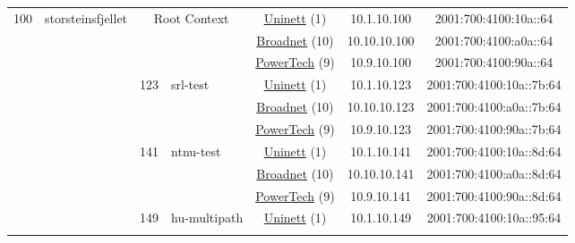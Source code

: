 \begin{small}
\begin{center}
\begin{longtable}{|c|c|c|c|c|c|c|c|}
 \multirow{33}{*}{\tiny{100}} & \multicolumn{1}{|l|}{\multirow{33}{*}{\tiny{storsteinsfjellet}}} & \multicolumn{2}{|c|}{\multirow{3}{*}{\tiny{Root Context}}} & \multicolumn{2}{|c|}{\tiny{\href{https://www.uninett.no}{Uninett} (1)}} & \tiny{10.1.10.100} & \tiny{2001:700:4100:10a::64} \\* \cline{5-5}\cline{6-6}\cline{7-7}\cline{8-8}
  &  & \multicolumn{2}{|c|}{} & \multicolumn{2}{|c|}{\tiny{\href{https://www.broadnet.no}{Broadnet} (10)}} & \tiny{10.10.10.100} & \tiny{2001:700:4100:a0a::64} \\* \cline{5-5}\cline{6-6}\cline{7-7}\cline{8-8}
  &  & \multicolumn{2}{|c|}{} & \multicolumn{2}{|c|}{\tiny{\href{http://www.powertech.no}{PowerTech} (9)}} & \tiny{10.9.10.100} & \tiny{2001:700:4100:90a::64} \\* \cline{3-3}\cline{4-4}\cline{5-5}\cline{6-6}\cline{7-7}\cline{8-8}
  &  & \multirow{3}{*}{\tiny{123}} & \multicolumn{1}{|l|}{\multirow{3}{*}{\tiny{srl-test}}} & \multicolumn{2}{|c|}{\tiny{\href{https://www.uninett.no}{Uninett} (1)}} & \tiny{10.1.10.123} & \tiny{2001:700:4100:10a::7b:64} \\* \cline{5-5}\cline{6-6}\cline{7-7}\cline{8-8}
  &  &  &  & \multicolumn{2}{|c|}{\tiny{\href{https://www.broadnet.no}{Broadnet} (10)}} & \tiny{10.10.10.123} & \tiny{2001:700:4100:a0a::7b:64} \\* \cline{5-5}\cline{6-6}\cline{7-7}\cline{8-8}
  &  &  &  & \multicolumn{2}{|c|}{\tiny{\href{http://www.powertech.no}{PowerTech} (9)}} & \tiny{10.9.10.123} & \tiny{2001:700:4100:90a::7b:64} \\* \cline{3-3}\cline{4-4}\cline{5-5}\cline{6-6}\cline{7-7}\cline{8-8}
  &  & \multirow{3}{*}{\tiny{141}} & \multicolumn{1}{|l|}{\multirow{3}{*}{\tiny{ntnu-test}}} & \multicolumn{2}{|c|}{\tiny{\href{https://www.uninett.no}{Uninett} (1)}} & \tiny{10.1.10.141} & \tiny{2001:700:4100:10a::8d:64} \\* \cline{5-5}\cline{6-6}\cline{7-7}\cline{8-8}
  &  &  &  & \multicolumn{2}{|c|}{\tiny{\href{https://www.broadnet.no}{Broadnet} (10)}} & \tiny{10.10.10.141} & \tiny{2001:700:4100:a0a::8d:64} \\* \cline{5-5}\cline{6-6}\cline{7-7}\cline{8-8}
  &  &  &  & \multicolumn{2}{|c|}{\tiny{\href{http://www.powertech.no}{PowerTech} (9)}} & \tiny{10.9.10.141} & \tiny{2001:700:4100:90a::8d:64} \\* \cline{3-3}\cline{4-4}\cline{5-5}\cline{6-6}\cline{7-7}\cline{8-8}
  &  & \multirow{3}{*}{\tiny{149}} & \multicolumn{1}{|l|}{\multirow{3}{*}{\tiny{hu-multipath}}} & \multicolumn{2}{|c|}{\tiny{\href{https://www.uninett.no}{Uninett} (1)}} & \tiny{10.1.10.149} & \tiny{2001:700:4100:10a::95:64} \\* \cline{5-5}\cline{6-6}\cline{7-7}\cline{8-8}

\end{longtable}
\end{center}
\end{small}
